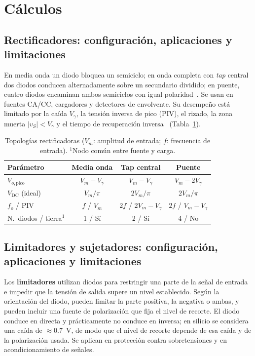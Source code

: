 \documentclass[conference,10pt]{IEEEtran}
\newcommand{\VDC}{V_{\mathrm{DC}}}
\newcommand{\Vg}{V_\gamma}
\begin{document}
\section{Cálculos}
\subsection{Rectificadores: configuración, aplicaciones y limitaciones}
En media onda un diodo bloquea un semiciclo; en onda completa con
\textit{tap} central dos diodos conducen alternadamente sobre un
secundario dividido; en puente, cuatro diodos encaminan ambos
semiciclos con igual polaridad~\cite{sedra}. Se usan en fuentes CA/CC,
cargadores y detectores de envolvente. Su desempeño está limitado por
la caída $\Vg$, la tensión inversa de pico (PIV), el rizado, la zona
muerta $|v_S|<\Vg$ y el tiempo de recuperación inversa~\cite{vishay}
(Tabla~\ref{tab:comp}).

\begin{table}[htbp]
\caption{Topologías rectificadoras ($V_m$: amplitud de entrada;
$f$: frecuencia de entrada). $^1$Nodo común entre fuente y carga.}
\label{tab:comp}
\centering
\footnotesize
\setlength{\tabcolsep}{3.5pt}
\begin{tabular}{lccc}
\toprule
\textbf{Parámetro} & \textbf{Media onda} & \textbf{Tap central} & \textbf{Puente}\\
\midrule
$V_{o,\text{pico}}$      & $V_m-\Vg$   & $V_m-\Vg$      & $V_m-2\Vg$\\
$\VDC$ (ideal)           & $V_m/\pi$   & $2V_m/\pi$     & $2V_m/\pi$\\
$f_o$ / PIV              & $f$ / $V_m$ & $2f$ / $2V_m{-}\Vg$ & $2f$ / $V_m{-}\Vg$\\
N.\ diodos / tierra$^1$  & 1 / Sí      & 2 / Sí         & 4 / No\\
\bottomrule
\end{tabular}
\end{table}

\subsection{Limitadores y sujetadores: configuración, aplicaciones y
limitaciones}
Los \textbf{limitadores} utilizan diodos para restringir una parte de
la señal de entrada e impedir que la tensión de salida supere un nivel
establecido. Según la orientación del diodo, pueden limitar la parte
positiva, la negativa o ambas, y pueden incluir una fuente de
polarización que fija el nivel de recorte. El diodo conduce en directa
y prácticamente no conduce en inversa; en silicio se considera una
caída de $\approx0.7$~V, de modo que el nivel de recorte depende de
esa caída y de la polarización usada. Se aplican en protección contra
sobretensiones y en acondicionamiento de señales.
\end{document}
